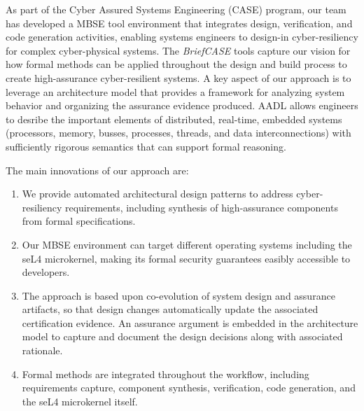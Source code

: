 As part of the Cyber Assured Systems Engineering (CASE) program,
our team has developed a MBSE tool environment that integrates design, verification,
and code generation activities, enabling systems engineers to design-in cyber-resiliency
for complex cyber-physical systems. The {\em BriefCASE} tools capture our 
vision for how formal methods can be applied throughout the design and build process 
to create high-assurance cyber-resilient systems.  
A key aspect of our approach is to leverage an
architecture model that provides a framework for analyzing
system behavior and organizing the assurance evidence produced.  
AADL allows engineers to desribe the important elements of distributed,
real-time, embedded systems (processors, memory, busses, processes, 
threads, and data interconnections) with sufficiently rigorous semantics
that can support formal reasoning.  

The main innovations of our approach are:

\begin{enumerate}

\item We provide automated architectural design patterns to address cyber-resiliency requirements, 
including synthesis of high-assurance components from formal specifications.

\item Our MBSE environment can target different operating systems including the seL4 microkernel, 
making its formal security guarantees easibly accessible to developers. 

\item The approach is based upon co-evolution of system design and assurance artifacts, so that
design changes automatically update the associated certification evidence. An assurance argument
is embedded in the architecture model to capture and document the design decisions 
along with associated rationale.

\item Formal methods are integrated throughout the workflow, including requirements capture,
component synthesis, verification, code generation, and the seL4 microkernel itself. 

\end{enumerate}




